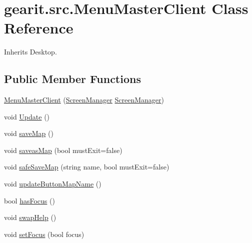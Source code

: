 \hypertarget{classgearit_1_1src_1_1_menu_master_client}{\section{gearit.\+src.\+Menu\+Master\+Client Class Reference}
\label{classgearit_1_1src_1_1_menu_master_client}
}


Inherits Desktop.

\subsection*{Public Member Functions}
\begin{DoxyCompactItemize}
\item 
\hyperlink{classgearit_1_1src_1_1_menu_master_client_a62ac425f4c9c63f4202141091dd89db4}{Menu\+Master\+Client} (\hyperlink{classgearit_1_1xna_1_1_screen_manager}{Screen\+Manager} \hyperlink{classgearit_1_1xna_1_1_screen_manager}{Screen\+Manager})
\item 
void \hyperlink{classgearit_1_1src_1_1_menu_master_client_a12e3db122dcb3a50bafec7e48db40881}{Update} ()
\item 
void \hyperlink{classgearit_1_1src_1_1_menu_master_client_a8f9c4f3686e507128492eb392fbe60b1}{save\+Map} ()
\item 
void \hyperlink{classgearit_1_1src_1_1_menu_master_client_ac170b3ca53015b36341136b627478c6d}{saveas\+Map} (bool must\+Exit=false)
\item 
void \hyperlink{classgearit_1_1src_1_1_menu_master_client_a7743f19d6de224a1f9da80a641040ccb}{safe\+Save\+Map} (string name, bool must\+Exit=false)
\item 
void \hyperlink{classgearit_1_1src_1_1_menu_master_client_a40c859c65ec73452d7208860e6c182a8}{update\+Button\+Map\+Name} ()
\item 
bool \hyperlink{classgearit_1_1src_1_1_menu_master_client_ac94a22ec8f9bbde5fa98170fbe5da6d9}{has\+Focus} ()
\item 
void \hyperlink{classgearit_1_1src_1_1_menu_master_client_a972aabe5a151787d8258bc586559f537}{swap\+Help} ()
\item 
void \hyperlink{classgearit_1_1src_1_1_menu_master_client_a09ee100984e6dbe5bfc68e4f6e348458}{set\+Focus} (bool focus)
\end{DoxyCompactItemize}
